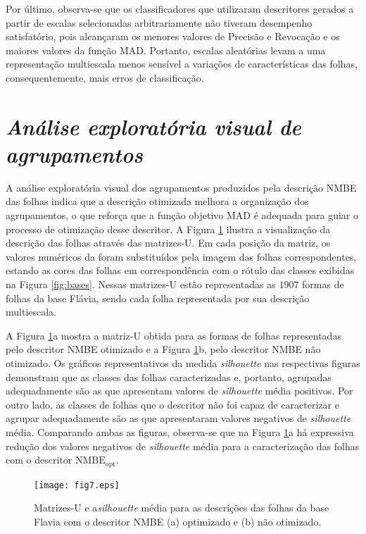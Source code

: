 {Por último, observa-se que os classificadores que utilizaram descritores gerados a partir de escalas selecionadas arbitrariamente não tiveram desempenho satisfatório, pois alcançaram os menores valores de Precisão e Revocação e os maiores valores da função MAD. Portanto, escalas aleatórias levam a uma representação multiescala menos sensível a variações de características das folhas, consequentemente, mais erros de classificação. 


\section{\emph{Análise exploratória visual de agrupamentos}}
A análise exploratória visual dos agrupamentos  produzidos pela descrição NMBE das folhas indica que a descrição otimizada melhora a organização dos agrupamentos, o que reforça que a função objetivo MAD é adequada para guiar o processo de otimização desse descritor. A Figura \ref{fig:MatrizU_leaves_256}  ilustra a visualização da descrição das folhas através  das matrizes-U. Em cada posição da matriz, os valores numéricos da foram substituídos pela imagem das folhas correspondentes, estando as cores das folhas em correspondência com o rótulo das classes exibidas na Figura \ref {fig:bases}. Nessas matrizes-U estão representadas as $1907$ formas de folhas da base Flávia, sendo cada folha representada por sua descrição multiescala.

A Figura \ref{fig:MatrizU_leaves_256}a mostra a matriz-U obtida para as formas de folhas representadas pelo descritor NMBE otimizado e a Figura \ref{fig:MatrizU_leaves_256}b, pelo descritor NMBE não otimizado. Os gráficos representativos da medida \emph{silhouette} nas respectivas figuras demonstram que as classes das folhas caracterizadas e, portanto, agrupadas adequadamente são as que apresentam valores de \emph{silhouette} média positivos. Por outro lado, as classes de folhas que o descritor não foi capaz de caracterizar e agrupar adequadamente são as que apresentaram valores negativos de \emph{silhouette} média. Comparando ambas as figuras, observa-se que na Figura \ref{fig:MatrizU_leaves_256}a há expressiva redução dos valores negativos de \emph{silhouette} média para a caracterização das folhas com o descritor $\operatorname{NMBE_{opt}}$. 

\begin{figure}[t]
\centering
\texttt{[image: fig7.eps]}
 \caption{\label{fig:MatrizU_leaves_256} Matrizes-U e a\emph{silhouette} média para as descrições das folhas da base Flavia com o descritor NMBE (a) optimizado e (b) não otimizado.}
\end{figure}
}
